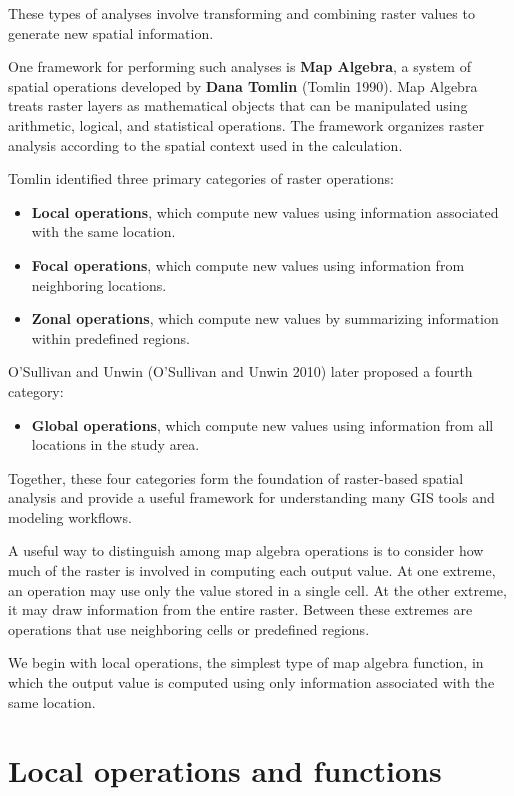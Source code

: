 \documentclass[
  letterpaper,
]{book}
\providecommand{\tightlist}{%
  \setlength{\itemsep}{0pt}\setlength{\parskip}{0pt}}
\begin{document}
These types of analyses involve transforming and combining raster values
to generate new spatial information.

One framework for performing such analyses is \textbf{Map Algebra}, a
system of spatial operations developed by \textbf{Dana Tomlin} (Tomlin
1990). Map Algebra treats raster layers as mathematical objects that can
be manipulated using arithmetic, logical, and statistical operations.
The framework organizes raster analysis according to the spatial context
used in the calculation.

Tomlin identified three primary categories of raster operations:

\begin{itemize}
\tightlist
\item
  \textbf{Local operations}, which compute new values using information
  associated with the same location.
\item
  \textbf{Focal operations}, which compute new values using information
  from neighboring locations.
\item
  \textbf{Zonal operations}, which compute new values by summarizing
  information within predefined regions.
\end{itemize}

O'Sullivan and Unwin (O'Sullivan and Unwin 2010) later proposed a fourth
category:

\begin{itemize}
\tightlist
\item
  \textbf{Global operations}, which compute new values using information
  from all locations in the study area.
\end{itemize}

Together, these four categories form the foundation of raster-based
spatial analysis and provide a useful framework for understanding many
GIS tools and modeling workflows.

A useful way to distinguish among map algebra operations is to consider
how much of the raster is involved in computing each output value. At
one extreme, an operation may use only the value stored in a single
cell. At the other extreme, it may draw information from the entire
raster. Between these extremes are operations that use neighboring cells
or predefined regions.

We begin with local operations, the simplest type of map algebra
function, in which the output value is computed using only information
associated with the same location.

\section{Local operations and
functions}\label{local-operations-and-functions}
\end{document}
